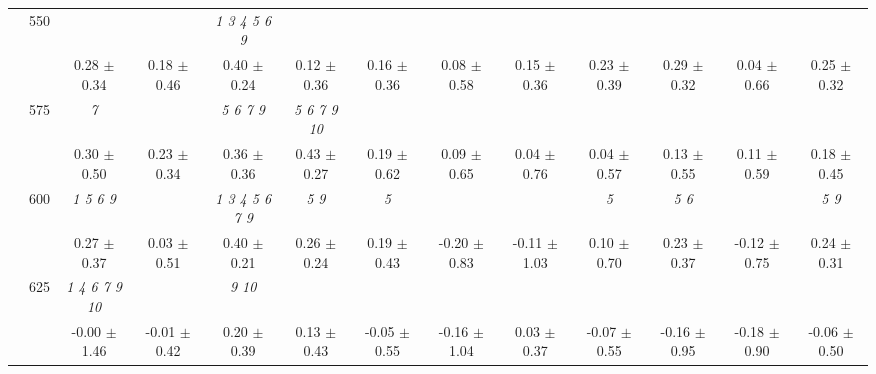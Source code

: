 \begin{table}[h]
{\begin{tabular}{
        ccccccccccccc}
 & \multirow{2}{*}{550}& & & \textit{ 1 3 4 5 6 9 }& & & & & & & &  \\ 
 & & 0.28 $\pm$ 0.34& 0.18 $\pm$ 0.46& 0.40 $\pm$ 0.24& 0.12 $\pm$ 0.36& 0.16 $\pm$ 0.36& 0.08 $\pm$ 0.58& 0.15 $\pm$ 0.36& 0.23 $\pm$ 0.39& 0.29 $\pm$ 0.32& 0.04 $\pm$ 0.66& 0.25 $\pm$ 0.32 \\ 
 & \multirow{2}{*}{575}& \cellcolor[HTML]{EFEFEF} \textit{ 7 }& \cellcolor[HTML]{EFEFEF} & \cellcolor[HTML]{EFEFEF} \textit{ 5 6 7 9 }& \cellcolor[HTML]{EFEFEF} \textit{  5  6  7  9 10 }& \cellcolor[HTML]{EFEFEF} & \cellcolor[HTML]{EFEFEF} & \cellcolor[HTML]{EFEFEF} & \cellcolor[HTML]{EFEFEF} & \cellcolor[HTML]{EFEFEF} & \cellcolor[HTML]{EFEFEF} & \cellcolor[HTML]{EFEFEF}  \\ 
 & & \cellcolor[HTML]{EFEFEF} 0.30 $\pm$ 0.50& \cellcolor[HTML]{EFEFEF} 0.23 $\pm$ 0.34& \cellcolor[HTML]{EFEFEF} 0.36 $\pm$ 0.36& \cellcolor[HTML]{EFEFEF} 0.43 $\pm$ 0.27& \cellcolor[HTML]{EFEFEF} 0.19 $\pm$ 0.62& \cellcolor[HTML]{EFEFEF} 0.09 $\pm$ 0.65& \cellcolor[HTML]{EFEFEF} 0.04 $\pm$ 0.76& \cellcolor[HTML]{EFEFEF} 0.04 $\pm$ 0.57& \cellcolor[HTML]{EFEFEF} 0.13 $\pm$ 0.55& \cellcolor[HTML]{EFEFEF} 0.11 $\pm$ 0.59& \cellcolor[HTML]{EFEFEF} 0.18 $\pm$ 0.45 \\ 
 & \multirow{2}{*}{600}& \textit{ 1 5 6 9 }& & \textit{ 1 3 4 5 6 7 9 }& \textit{ 5 9 }& \textit{ 5 }& & & \textit{ 5 }& \textit{ 5 6 }& & \textit{ 5 9 } \\ 
 & & 0.27 $\pm$ 0.37& 0.03 $\pm$ 0.51& 0.40 $\pm$ 0.21& 0.26 $\pm$ 0.24& 0.19 $\pm$ 0.43& -0.20 $\pm$ 0.83& -0.11 $\pm$ 1.03& 0.10 $\pm$ 0.70& 0.23 $\pm$ 0.37& -0.12 $\pm$ 0.75& 0.24 $\pm$ 0.31 \\ 
 & \multirow{2}{*}{625}& \cellcolor[HTML]{EFEFEF} \textit{  1  4  6  7  9 10 }& \cellcolor[HTML]{EFEFEF} & \cellcolor[HTML]{EFEFEF} \textit{  9 10 }& \cellcolor[HTML]{EFEFEF} & \cellcolor[HTML]{EFEFEF} & \cellcolor[HTML]{EFEFEF} & \cellcolor[HTML]{EFEFEF} & \cellcolor[HTML]{EFEFEF} & \cellcolor[HTML]{EFEFEF} & \cellcolor[HTML]{EFEFEF} & \cellcolor[HTML]{EFEFEF}  \\ 
 & & \cellcolor[HTML]{EFEFEF} -0.00 $\pm$ 1.46& \cellcolor[HTML]{EFEFEF} -0.01 $\pm$ 0.42& \cellcolor[HTML]{EFEFEF} 0.20 $\pm$ 0.39& \cellcolor[HTML]{EFEFEF} 0.13 $\pm$ 0.43& \cellcolor[HTML]{EFEFEF} -0.05 $\pm$ 0.55& \cellcolor[HTML]{EFEFEF} -0.16 $\pm$ 1.04& \cellcolor[HTML]{EFEFEF} 0.03 $\pm$ 0.37& \cellcolor[HTML]{EFEFEF} -0.07 $\pm$ 0.55& \cellcolor[HTML]{EFEFEF} -0.16 $\pm$ 0.95& \cellcolor[HTML]{EFEFEF} -0.18 $\pm$ 0.90& \cellcolor[HTML]{EFEFEF} -0.06 $\pm$ 0.50 \\ 

\end{tabular}}
\end{table}
